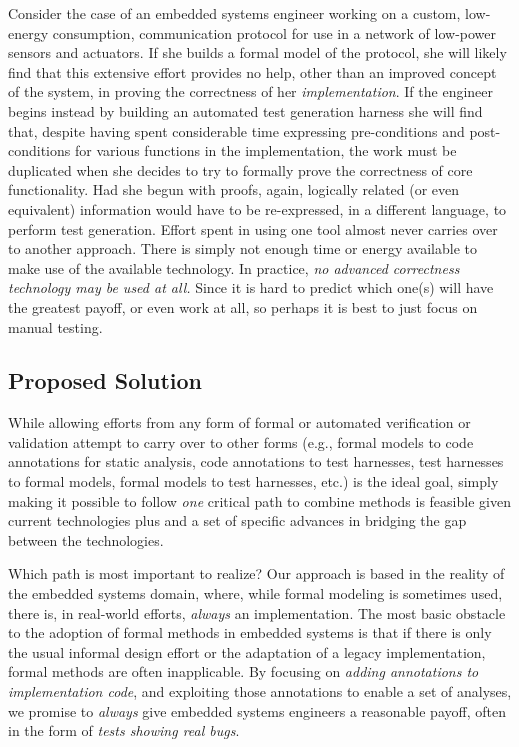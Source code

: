 Consider the case of an embedded systems engineer working on a custom, low-energy consumption, communication protocol for use in a network of low-power sensors and actuators.  If she builds a formal model of the protocol, she will likely find that this extensive effort provides no help, other than an improved concept of the system, in proving the correctness of her \emph{implementation}.  If the engineer begins instead by building an automated test generation harness she will find that, despite having spent considerable time expressing pre-conditions and post-conditions for various functions in the implementation, the work must be duplicated when she decides to try to formally prove the correctness of core functionality.  Had she begun with proofs, again, logically related (or even equivalent) information would have to be re-expressed, in a different language, to perform test generation.  Effort spent in using one tool almost never carries over to another approach.  There is simply not enough time or energy available to make use of the available technology.  In practice, \emph{no advanced correctness technology may be used at all.}  Since it is hard to predict which one(s) will have the greatest payoff, or even work at all, so perhaps it is best to just focus on manual testing.

\subsection{Proposed Solution}

While allowing efforts from any form of formal or automated verification or validation attempt to carry over to other forms (e.g., formal models to code annotations for static analysis, code annotations to test harnesses, test harnesses to formal models, formal models to test harnesses, etc.) is the ideal goal, simply making it possible to follow \emph{one} critical path to combine methods is feasible given current technologies plus and a set of specific advances in bridging the gap between the technologies.

Which path is most important to realize?  Our approach is based in the reality of the embedded systems domain, where, while formal modeling is sometimes used, there is, in real-world efforts, \emph{always} an implementation.  The most basic obstacle to the adoption of formal methods in embedded systems is that if there is only the usual informal design effort or the adaptation of a legacy implementation, formal methods are often inapplicable.  By focusing on \emph{adding annotations to implementation code}, and exploiting those annotations to enable a set of analyses, we promise to \emph{always} give embedded systems engineers a reasonable payoff, often in the form of \emph{tests showing real bugs}.

